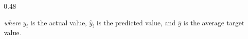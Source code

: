 \begin{frame}
\begin{columns}[T,onlytextwidth]
\begin{column}{0.48\textwidth}
            \vspace{0.1cm}

            \textit{where} $y_i$ is the actual value, $\hat{y}_i$ is the predicted value, and $\bar{y}$ is the average target value.

        \end{column}

    \end{columns}

\end{frame}